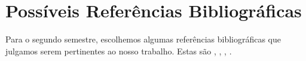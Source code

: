 \chapter{Possíveis Referências Bibliográficas} %
\label{cha:poss_veis_refer_ncias_bibliogr_ficas}

Para o segundo semestre, escolhemos algumas referências bibliográficas que julgamos serem pertinentes ao nosso trabalho. Estas são \cite{hansen2009mixing}, \cite{shani2011evaluating}, \cite{de2010combining}, \cite{guo2010improved}.